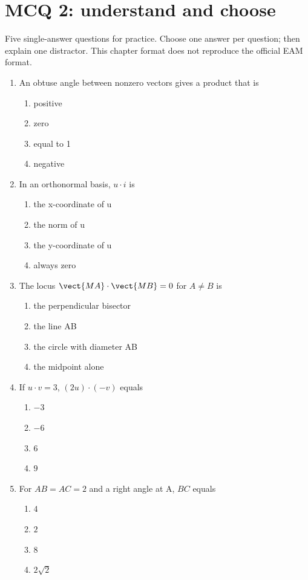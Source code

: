 \endgroup
\begingroup\small
{}\section*{MCQ 2: understand and choose}\label{C03-Q2}
Five single-answer questions for practice. Choose one answer per question; then explain one distractor. This chapter format does not reproduce the official EAM format.
\begin{enumerate}
\item An obtuse angle between nonzero vectors gives a product that is
\begin{enumerate}[label=\Alph*.,itemsep=2pt]
\item positive
\item zero
\item equal to 1
\item negative
\end{enumerate}
\item In an orthonormal basis, $u\cdot i$ is
\begin{enumerate}[label=\Alph*.,itemsep=2pt]
\item the x-coordinate of u
\item the norm of u
\item the y-coordinate of u
\item always zero
\end{enumerate}
\item The locus $\vect{MA}\cdot\vect{MB}=0$ for $A\ne B$ is
\begin{enumerate}[label=\Alph*.,itemsep=2pt]
\item the perpendicular bisector
\item the line AB
\item the circle with diameter AB
\item the midpoint alone
\end{enumerate}
\item If $u\cdot v=3$, $(2u)\cdot(-v)$ equals
\begin{enumerate}[label=\Alph*.,itemsep=2pt]
\item $-3$
\item $-6$
\item $6$
\item $9$
\end{enumerate}
\item For $AB=AC=2$ and a right angle at A, $BC$ equals
\begin{enumerate}[label=\Alph*.,itemsep=2pt]
\item $4$
\item $2$
\item $8$
\item $2\sqrt2$
\end{enumerate}
\end{enumerate}
